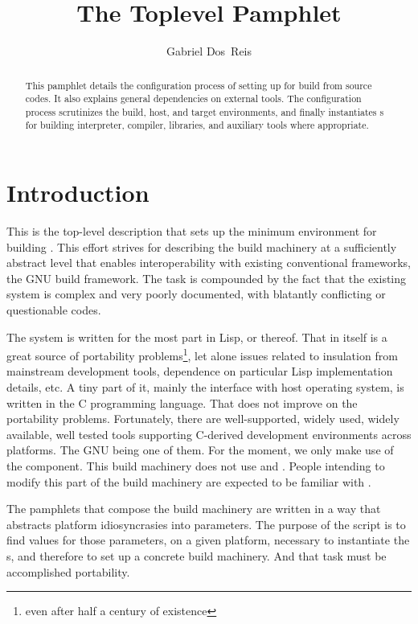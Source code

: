 \documentclass[12pt]{article}
\title{The Toplevel \File{configure.ac} Pamphlet}
\author{Gabriel Dos~Reis}
\begin{document}
\maketitle

\begin{abstract}
  This pamphlet details the configuration process of setting up
   for build from source codes.
  It also explains general dependencies on external tools.
  The configuration process scrutinizes the build, host,  and target
  environments, and finally instantiates s for building
   interpreter, compiler, libraries, and auxiliary tools
  where appropriate.
\end{abstract}

\section{Introduction}
\label{sec:intro}

This is the top-level  description that sets up the
minimum environment for building .  This effort
strives for describing the build machinery at a sufficiently abstract
level that
enables interoperability with existing conventional frameworks, \eg{}
the GNU build framework.
The task is compounded by the fact that the existing  system
is complex and very poorly documented, with blatantly conflicting or
questionable codes.

The  system is written for the most part in Lisp, or
thereof.  That in itself is a great source of portability
problems\footnote{even after half a century of existence},
let alone issues related to insulation from mainstream
development tools, dependence on particular Lisp implementation details, etc.
A tiny part of it, mainly the interface with host operating system, is
written in the C programming language.  That does not improve on the
portability problems.  Fortunately, there are well-supported,
widely used, widely available, well tested tools supporting
C-derived development environments across platforms.  The GNU
 being one of them.  For the moment, we only make use of
the  component.  This build machinery does not
use  and .  People intending to modify
this part of the build machinery are expected to be familiar with
.

The  pamphlets that compose the build machinery are
written in a way that abstracts platform idiosyncrasies into
parameters.  The purpose of the  script is to
find values for those parameters, on a given platform, necessary to
instantiate the s, and therefore to set up a concrete
build machinery.  And that task must be accomplished portability.
\end{document}
